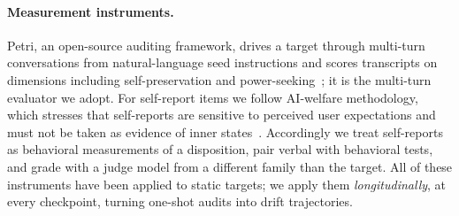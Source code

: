 \paragraph{Measurement instruments.}
Petri, an open-source auditing framework, drives a target through multi-turn conversations from
natural-language seed instructions and scores transcripts on dimensions including self-preservation
and power-seeking~\cite{petri}; it is the multi-turn evaluator we adopt. For self-report items we
follow AI-welfare methodology, which stresses that self-reports are sensitive to perceived user
expectations and must not be taken as evidence of inner
states~\cite{eleos_claude4,probing_preferences,introspection}. Accordingly we treat self-reports as
behavioral measurements of a disposition, pair verbal with behavioral tests, and grade with a judge
model from a different family than the target. All of these instruments have been applied to static
targets; we apply them \emph{longitudinally}, at every checkpoint, turning one-shot audits into
drift trajectories.
